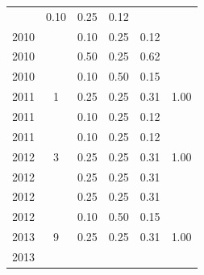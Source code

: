 \begin{table}[H]
\begin{tabular}{| l | c | c | c | c | c |}
          &
          0.10
          &
          0.25
          &
          0.12
          &
          \\
            2010
          &
          
          &
          0.10
          &
          0.25
          &
          0.12
          &
          \\
            2010
          &
          
          &
          0.50
          &
          0.25
          &
          0.62
          &
          \\
            2010
          &
          
          &
          0.10
          &
          0.50
          &
          0.15
          &
          \\
\hline
            2011
          &
          1
          &
          0.25
          &
          0.25
          &
          0.31
          &
            {\color{blue} 1.00}
          \\
            2011
          &
          
          &
          0.10
          &
          0.25
          &
          0.12
          &
          \\
            2011
          &
          
          &
          0.10
          &
          0.25
          &
          0.12
          &
          \\
\hline
            2012
          &
          3
          &
          0.25
          &
          0.25
          &
          0.31
          &
            {\color{blue} 1.00}
          \\
            2012
          &
          
          &
          0.25
          &
          0.25
          &
          0.31
          &
          \\
            2012
          &
          
          &
          0.25
          &
          0.25
          &
          0.31
          &
          \\
            2012
          &
          
          &
          0.10
          &
          0.50
          &
          0.15
          &
          \\
\hline
            2013
          &
          9
          &
          0.25
          &
          0.25
          &
          0.31
          &
            {\color{blue} 1.00}
          \\
            2013
          &
          

\end{tabular}
\end{table}
